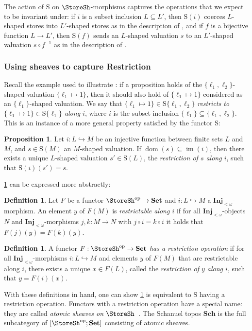 \documentclass[
  sigconf,
  screen, ]{acmart}
\makeatletter
\theoremstyle{definition}
\newtheorem{definition}[theorem]{Definition}
\newtheorem{proposition}[theorem]{Proposition}
\newcommand\img{\operatorname{im}}
\newcommand{\dom}{\operatorname{dom}}
\newcommand{\labelword}[2]{\phantomsection
  #1\def\@currentlabel{\unexpanded{#1}}\label{#2}}
\newcommand\nref[2]{\hyperref[#1]{#2}} \newcommand\checkhigh{{\huge{\color{red}\textbf{TODO: check}}}}
\newcommand\funcat[2]{[#1;#2]}
\newcommand\FinInj{{\nref{def:FinInj}{\mathbf{Inj}_{<\omega}}}}
\newcommand\op{^{\rm op}}
\newcommand\Set{\mathbf{Set}}
\newcommand\Store{{\nref{def:store}{\mathrm{S}}}}
\newcommand\Sch{{\nref{def:Sch}{\mathbf{Sch}}}}
\makeatother
\begin{document}
The action of $\Store$ on $\StoreSh$-morphisms
captures the operations that we expect to be invariant under:
if $i$ is a subset inclusion $L\subseteq L'$,
then $\Store(i)$ coerces $L$-shaped stores
into $L'$-shaped stores as in the description of \Extension{},
and if $f$ is a bijective function $L\to L'$,
then $\Store(f)$ sends an $L$-shaped valuation $s$
to an $L'$-shaped valuation $s\circ f^{-1}$
as in the description of \Renaming{}.

\subsubsection{Using sheaves to capture Restriction}

Recall the example used to illustrate \Restriction:
if a proposition holds of the $\{\ell_1,\ell_2\}$-shaped
valuation $\{\ell_1\mapsto 1\}$,
then it should also hold of $\{\ell_1\mapsto 1\}$
considered as an $\{\ell_1\}$-shaped valuation.
We say that $\{\ell_1\mapsto 1\}\in\Store\{\ell_1,\ell_2\}$
\emph{restricts to $\{\ell_1\mapsto 1\}\in\Store\{\ell_1\}$
along $i$}, where $i$ is the 
subset-inclusion $\{\ell_1\}\subseteq\{\ell_1,\ell_2\}$.
This is an instance of a more general property satisfied
by the functor $\Store$:

\begin{proposition} \label{prop:store-atomic-sheaf-cond}
  Let $i : L\hookrightarrow M$ be an injective function between finite sets $L$ and $M$,
  and $s\in\Store(M)$ an $M$-shaped valuation.
  If $\dom(s)\subseteq\img(i)$,
  then there exists a unique $L$-shaped valuation $s'\in\Store(L)$,
  the \emph{restriction of $s$ along $i$},
  such that $\Store(i)(s') = s$.
\end{proposition}
\cref{prop:store-atomic-sheaf-cond} can be expressed more abstractly:
\begin{definition}
  Let $F$ be a functor $\StoreSh\op\to\Set$
  and $i : L\hookrightarrow M$ a $\FinInj$-morphism.
  An element $y$ of $F(M)$
  is \emph{restrictable along $i$}
  if for all $\FinInj$-objects
  $N$ and $\FinInj$-morphisms $j,k : M\to N$
  with $j\circ i = k\circ i$
  it holds that $F(j)(y) = F(k)(y)$.
\end{definition}

\begin{definition} \label{def:atomic-sheaf-condition}
  A functor $F : \StoreSh\op\to\Set$ 
  \emph{has a restriction operation}
  if for all $\FinInj$-morphisms $i : L\hookrightarrow M$
  and elements $y$ of $F(M)$ that are restrictable along $i$,
  there exists a unique $x\in F(L)$,
  called the \emph{restriction of $y$ along $i$},
  such that $y = F(i)(x)$.
\end{definition}
With these definitions in hand,
one can show
\cref{prop:store-atomic-sheaf-cond}
is equivalent to $\Store$ having a restriction operation.
Functors with a restriction operation
have a special name: they are
called \emph{atomic sheaves on $\StoreSh$}~\cite[Lemma III.4.2]{maclane2012sheaves}.
\labelword{The}{def:Sch} Schanuel topos $\Sch$ is the full subcategory of
$\funcat{\StoreSh\op}\Set$ consisting of atomic sheaves.
\end{document}
